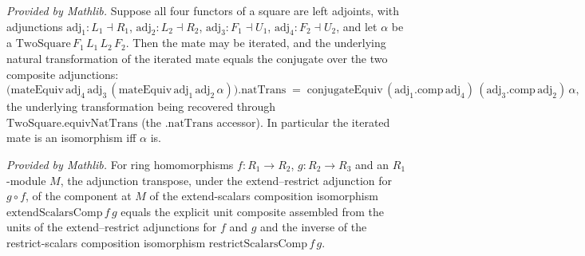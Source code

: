\begin{lemma}
  \label{lem:iterated_mateEquiv_conjugateEquiv_mathlib}
  \mathlibok
  \textit{Provided by Mathlib.}
  Suppose all four functors of a square are left adjoints, with adjunctions
  \(\mathrm{adj}_1 : L_1 \dashv R_1\), \(\mathrm{adj}_2 : L_2 \dashv R_2\),
  \(\mathrm{adj}_3 : F_1 \dashv U_1\), \(\mathrm{adj}_4 : F_2 \dashv U_2\), and let \(\alpha\)
  be a \(\mathrm{TwoSquare}\,F_1\,L_1\,L_2\,F_2\). Then the mate may be iterated, and the
  underlying natural transformation of the iterated mate equals the conjugate over the two
  composite adjunctions:
  \[
    \bigl(\mathrm{mateEquiv}\,\mathrm{adj}_4\,\mathrm{adj}_3\,
      (\mathrm{mateEquiv}\,\mathrm{adj}_1\,\mathrm{adj}_2\,\alpha)\bigr).\mathrm{natTrans}
      \;=\;
    \mathrm{conjugateEquiv}\,(\mathrm{adj}_1.\mathrm{comp}\,\mathrm{adj}_4)\,
      (\mathrm{adj}_3.\mathrm{comp}\,\mathrm{adj}_2)\,\alpha,
  \]
  the underlying transformation being recovered through \(\mathrm{TwoSquare.equivNatTrans}\)
  (the \(\mathrm{.natTrans}\) accessor). In particular the iterated mate is an isomorphism iff
  \(\alpha\) is.
\end{lemma}

\begin{lemma}
  \label{lem:homEquiv_extendScalarsComp_mathlib}
  \mathlibok
  \textit{Provided by Mathlib.}
  For ring homomorphisms \(f : R_1 \to R_2\), \(g : R_2 \to R_3\) and an
  \(R_1\)-module \(M\), the adjunction transpose, under the extend--restrict
  adjunction for \(g \circ f\), of the component at \(M\) of the extend-scalars
  composition isomorphism \(\mathrm{extendScalarsComp}\,f\,g\) equals the explicit
  unit composite assembled from the units of the extend--restrict adjunctions for
  \(f\) and \(g\) and the inverse of the restrict-scalars composition isomorphism
  \(\mathrm{restrictScalarsComp}\,f\,g\).
\end{lemma}

